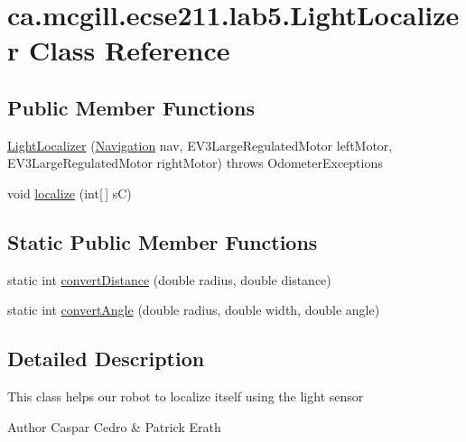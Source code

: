 \hypertarget{classca_1_1mcgill_1_1ecse211_1_1lab5_1_1_light_localizer}{}\section{ca.\+mcgill.\+ecse211.\+lab5.\+Light\+Localizer Class Reference}
\label{classca_1_1mcgill_1_1ecse211_1_1lab5_1_1_light_localizer}
\subsection*{Public Member Functions}
\begin{DoxyCompactItemize}
\item 
\hyperlink{classca_1_1mcgill_1_1ecse211_1_1lab5_1_1_light_localizer_a83dbb9eaea19092e27f6f9acdd35d37a}{Light\+Localizer} (\hyperlink{classca_1_1mcgill_1_1ecse211_1_1lab5_1_1_navigation}{Navigation} nav, E\+V3\+Large\+Regulated\+Motor left\+Motor, E\+V3\+Large\+Regulated\+Motor right\+Motor)  throws Odometer\+Exceptions 
\item 
void \hyperlink{classca_1_1mcgill_1_1ecse211_1_1lab5_1_1_light_localizer_a441f56a899fae5bc9c1d6a6d25fbe0bb}{localize} (int\mbox{[}$\,$\mbox{]} sC)
\end{DoxyCompactItemize}
\subsection*{Static Public Member Functions}
\begin{DoxyCompactItemize}
\item 
static int \hyperlink{classca_1_1mcgill_1_1ecse211_1_1lab5_1_1_light_localizer_a9eebe889aa2d4d2e881f413cc727cd9c}{convert\+Distance} (double radius, double distance)
\item 
static int \hyperlink{classca_1_1mcgill_1_1ecse211_1_1lab5_1_1_light_localizer_ab9d7289c4badf692fd5c83635305f2c5}{convert\+Angle} (double radius, double width, double angle)
\end{DoxyCompactItemize}


\subsection{Detailed Description}
This class helps our robot to localize itself using the light sensor

\begin{DoxyAuthor}{Author}
Caspar Cedro \& Patrick Erath 
\end{DoxyAuthor}


